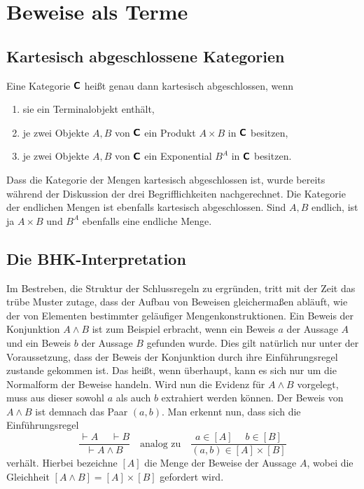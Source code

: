 \newpage
\section{Beweise als Terme}

\subsection{Kartesisch abgeschlossene Kategorien}

\begin{Definition}\newlinefirst
Eine Kategorie $\textsf{\textbf{C}}$ heißt genau dann kartesisch abgeschlossen,
wenn
\begin{enumerate}[nosep]
\item sie ein Terminalobjekt enthält,
\item je zwei Objekte $A,B$ von $\textsf{\textbf{C}}$ ein Produkt
  $A\times B$ in $\textsf{\textbf{C}}$ besitzen,
\item je zwei Objekte $A,B$ von $\textsf{\textbf{C}}$ ein Exponential
  $B^A$ in $\textsf{\textbf{C}}$ besitzen.
\end{enumerate}
\end{Definition}

\noindent
Dass die Kategorie der Mengen kartesisch abgeschlossen ist, wurde
bereits während der Diskussion der drei Begrifflichkeiten
nachgerechnet. Die Kategorie der endlichen Mengen ist ebenfalls
kartesisch abgeschlossen. Sind $A,B$ endlich, ist ja $A\times B$
und $B^A$ ebenfalls eine endliche Menge.

\subsection{Die BHK-Interpretation}

Im Bestreben, die Struktur der Schlussregeln zu ergründen, tritt
mit der Zeit das trübe Muster zutage, dass der Aufbau von Beweisen
gleichermaßen abläuft, wie der von Elementen bestimmter geläufiger
Mengenkonstruktionen. Ein Beweis der Konjunktion $A\land B$ ist
zum Beispiel erbracht, wenn ein Beweis $a$ der Aussage $A$ und
ein Beweis $b$ der Aussage $B$ gefunden wurde. Dies gilt natürlich
nur unter der Voraussetzung, dass der Beweis der Konjunktion durch ihre
Einführungsregel zustande gekommen ist. Das heißt, wenn überhaupt,
kann es sich nur um die Normalform der Beweise handeln. Wird nun die
Evidenz für $A\land B$ vorgelegt, muss aus dieser sowohl $a$ als auch
$b$ extrahiert werden können. Der Beweis von $A\land B$ ist demnach
das Paar $(a,b)$. Man erkennt nun, dass sich die Einführungsregel
\[\dfrac{\vdash A\quad\;\vdash B}{\vdash A\land B}\quad\text{analog zu}\quad
\dfrac{a\in [A]\quad\; b\in [B]}{(a,b)\in [A]\times [B]}\]
verhält. Hierbei bezeichne $[A]$ die Menge der Beweise der Aussage $A$,
wobei die Gleichheit $[A\land B] = [A]\times [B]$ gefordert wird.

